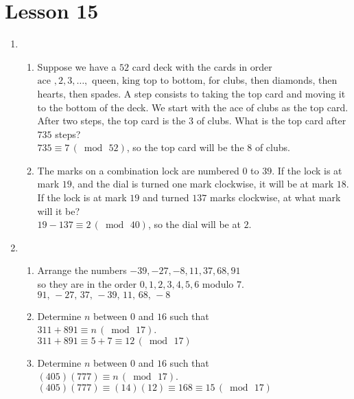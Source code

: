 \documentclass[11pt]{amsart}
\begin{document}
\vfill

\section{Lesson 15}

\begin{enumerate}

\item
\begin{enumerate}
\item Suppose we have a $52$ card deck with the cards in order $\text{ace }, 2, 3, \ldots,\text{ queen, king}$ 
top to bottom, for clubs, then diamonds, then hearts, then spades. A step consists to taking the top card and moving it to the bottom of the deck. We start with the ace of clubs as the top card. After two steps, the top card is the $3$ of clubs. What is the top card after $735$ steps?\\[3pt]
{\color{blue}
$735 \equiv  7 \,(\bmod\,52)$, so the top card will be the $8$ of clubs.\\[3pt]
}

\item The marks on a combination lock are numbered $0$ to $39$. If the lock is at  mark $19$, and the dial is turned one mark clockwise, it will be
at mark $18$. If the lock is at mark $19$ and turned $137$ marks clockwise, at what mark will it be?\\[3pt]
{\color{blue}
$19-137  \equiv  2 \,(\bmod\,40)$, so the dial will be at $2$.\\[5pt]
}

\end{enumerate}

\item 
\begin{enumerate}
\item Arrange the numbers $-39, -27, -8, 11, 37, 68, 91$ \\
so they are in the order $0,1,2,3,4,5,6$ modulo $7$.\\[3pt]
{\color{blue}
$91,\,-27,\,37,\,-39,\,11,\,68,\, -8$\\[3pt]
}

\item  Determine $n$ between $0$ and $16$ such that\\
 $311+891 \equiv n \,(\bmod\,17)$.\\[3pt]
 {\color{blue}
 $311+891 \equiv   5 + 7\equiv 12 \,(\bmod\,17)$\\[3pt]
 }
 \item Determine $n$ between $0$ and $16$ such that \\
$(405)(777) \equiv n \,(\bmod\,17)$.\\[3pt]
{\color{blue}
$(405)(777) \equiv (14)(12) \equiv 168 \equiv 15 \,(\bmod\,17)$\\[3pt]
}


\end{enumerate}
\end{enumerate}
\end{document}
